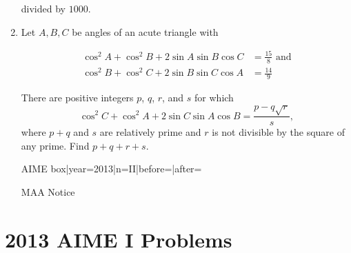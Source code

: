 \documentclass{article}
\begin{document}
\begin{enumerate}[label=\arabic*., itemsep=0.5em]
divided by \(1000\).\par \vspace{0.5em}\item Let \(A,B,C\) be angles of an acute triangle with

\begin{align*}
\cos^2 A + \cos^2 B + 2 \sin A \sin B \cos C &= \frac{15}{8} \text{ and} \\
\cos^2 B + \cos^2 C + 2 \sin B \sin C \cos A &= \frac{14}{9}
\end{align*}

There are positive integers \(p\), \(q\), \(r\), and \(s\) for which 
\begin{equation*}
\cos^2 C + \cos^2 A + 2 \sin C \sin A \cos B = \frac{p-q\sqrt{r}}{s},
\end{equation*}
 where \(p+q\) and \(s\) are relatively prime and \(r\) is not divisible by the square of any prime.  Find \(p+q+r+s\).



{{AIME box|year=2013|n=II|before=|after=}}

{{MAA Notice}}\par \vspace{0.5em}\end{enumerate}\newpage\section*{2013 AIME I Problems}
\end{document}

